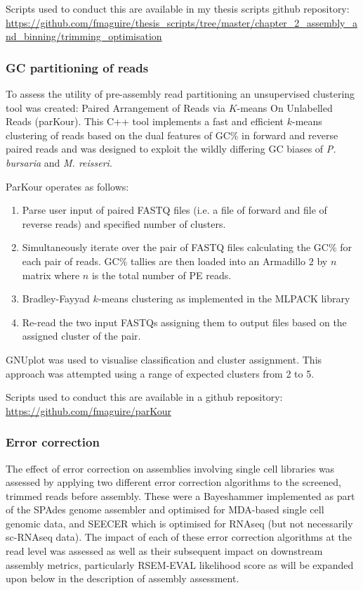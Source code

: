 Scripts used to conduct this are available in my thesis scripts github repository:
\url{https://github.com/fmaguire/thesis_scripts/tree/master/chapter_2_assembly_and_binning/trimming_optimisation}

\subsubsection{GC partitioning of reads}

To assess the utility of pre-assembly read partitioning an unsupervised clustering tool was created:
Paired Arrangement of Reads via \(K\)-means On Unlabelled Reads (parKour).
This C++ tool implements a fast and efficient \(k\)-means clustering of reads based on the dual features
of GC\% in forward and reverse paired reads and was designed to exploit the wildly differing GC
biases of \textit{P. bursaria} and \textit{M. reisseri}.

ParKour operates as follows:
\begin{enumerate}
    \item Parse user input of paired FASTQ files (i.e. a file of forward and file of reverse reads) and specified number of clusters.
    \item Simultaneously iterate over the pair of FASTQ files calculating the GC\% for each pair of reads. GC\% tallies are then loaded into an Armadillo \(2\) by \(n\) matrix \citep{Sanderson2010} where \(n\) is the total number of PE reads.
    \item Bradley-Fayyad \(k\)-means \citep{Bradley1998} clustering as implemented in the MLPACK library \citep{mlpack2013}
    \item Re-read the two input FASTQs assigning them to output files based on the assigned cluster of the pair.
\end{enumerate}

GNUplot \citep{Gnuplot44} was used to visualise classification and cluster assignment.
This approach was attempted using a range of expected clusters from 2 to 5.

Scripts used to conduct this are available in a github repository:
\url{https://github.com/fmaguire/parKour}

\subsubsection{Error correction}

The effect of error correction on assemblies involving single cell libraries was assessed 
by applying two different error correction algorithms to the screened, trimmed reads before assembly.
These were a Bayeshammer \citep{Nikolenko2013} implemented as part of the SPAdes 
genome assembler \citep{Bankevich2012} and optimised for MDA-based single cell genomic data, 
and SEECER \citep{Le2013} which is optimised for RNAseq (but not necessarily sc-RNAseq
data). 
The impact of each of these error correction algorithms at the read level was assessed as well 
as their subsequent impact on downstream assembly metrics, particularly RSEM-EVAL likelihood score
as will be expanded upon below in the description of assembly assessment.

